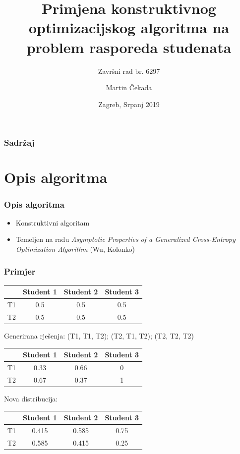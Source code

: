 \documentclass{beamer}
\title[Obrana završnog rada] %
{Primjena konstruktivnog optimizacijskog algoritma na problem
rasporeda studenata}
\subtitle{Završni rad br. 6297}
\author[Martin Čekada] %
{Martin Čekada}
\institute[FER] %
{
  Sveučilište u Zagrebu

  Fakultet elektrotehnike i računarstva
}
\date[Zagreb, Srpanj 2019] %
{Zagreb, Srpanj 2019}
\begin{document}
\frame{\titlepage}

\begin{frame}
\frametitle{Sadržaj}
\tableofcontents
\end{frame}

\section{Opis algoritma}
\begin{frame}
\frametitle{Opis algoritma}
\begin{itemize}
  \item Konstruktivni algoritam
  \item Temeljen na radu \textit{Asymptotic Properties of a Generalized Cross-Entropy Optimization Algorithm} (Wu, Kolonko)
  \end{itemize}
\end{frame}


\begin{frame}
\frametitle{Primjer}
  \begin{table}
    \centering
    \begin{tabular}{c | c | c | c }
       & Student 1 & Student 2 & Student 3  \\ \hline
      T1 & 0.5 & 0.5 & 0.5 \\ \hline
      T2 & 0.5 & 0.5 & 0.5
    \end{tabular}
  \end{table}


  Generirana rješenja: (T1, T1, T2); (T2, T1, T2); (T2, T2, T2)


  \begin{table}
    \centering
    \begin{tabular}{c | c | c | c }
       & Student 1 & Student 2 & Student 3  \\ \hline
      T1 & 0.33 & 0.66 & 0 \\ \hline
      T2 & 0.67 & 0.37 & 1
    \end{tabular}
  \end{table}

  Nova distribucija:
  \begin{table}
    \centering
    \begin{tabular}{c | c | c | c }
       & Student 1 & Student 2 & Student 3  \\ \hline
      T1 & 0.415 & 0.585 & 0.75 \\ \hline
      T2 & 0.585 & 0.415 & 0.25
    \end{tabular}
  \end{table}
\end{frame}
\end{document}
